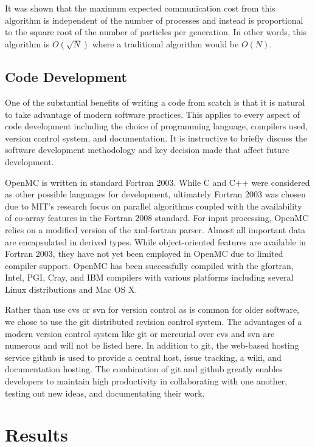 \documentclass{elsarticle}
\begin{document}
It was shown \cite{fissionbank} that the maximum expected communication cost
from this algorithm is independent of the number of processes and instead is
proportional to the square root of the number of particles per generation. In
other words, this algorithm is $O({\sqrt{N}})$ where a traditional algorithm
would be $O({N})$.

\subsection{Code Development}

One of the substantial benefits of writing a code from scatch is that it is
natural to take advantage of modern software practices. This applies to every
aspect of code development including the choice of programming language,
compilers used, version control system, and documentation. It is instructive to briefly
discuss the software development methodology and key decision made that affect
future development.

OpenMC is written in standard Fortran 2003. While C and C++ were considered as
other possible languages for development, ultimately Fortran 2003 was chosen due
to MIT's research focus on parallel algorithms coupled with the availability of
co-array features in the Fortran 2008 standard. For input processing, OpenMC
relies on a modified version of the xml-fortran \cite{xml-fortran}
parser. Almost all important data are encapsulated in derived types. While
object-oriented features are available in Fortran 2003, they have not yet been
employed in OpenMC due to limited compiler support. OpenMC has been successfully
compiled with the gfortran, Intel, PGI, Cray, and IBM compilers with various
platforms including several Linux distributions and Mac OS X.

Rather than use cvs or svn for version control as is common for older software,
we chose to use the git distributed revision control system. The advantages of a
modern version control system like git or mercurial over cvs and svn are
numerous and will not be listed here. In addition to git, the web-based hosting
service github is used to provide a central host, issue tracking, a wiki, and
documentation hosting. The combination of git and github greatly enables
developers to maintain high productivity in collaborating with one another,
testing out new ideas, and documentating their work.

\section{Results}
\end{document}
